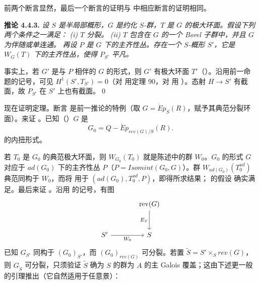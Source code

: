 前两个断言显然，最后一个断言的证明与  中相应断言的证明相同。

\textbf{推论 4.4.3.} \emph{设 \(S\) 是半局部概形，\(G\) 是约化 \(S\)-群，\(T\) 是 \(G\) 的极大环面。假设下列两个条件之一满足：}
\emph{(i) \(T\) 分裂。}
\emph{(ii) \(T\) 包含在 \(G\) 的一个 Borel 子群中，并且 \(G\) 为伴随或单连通。}
\emph{再设 \(P\) 是 \(G\) 下的主齐性丛。存在一个 \(S\)-概形 \(S'\)，它是 \(W_{G}(T)\) 下的主齐性丛，使得 \(P_{S'}\) 平凡。}

事实上，若 \(G'\) 是与 \(P\) 相伴的 \(G\) 的形式，则 \(G'\) 有极大环面 \(T'\)（）。沿用前一命题的记号，可见 \(H^{1}(S', T_{S'}) = 0\)（对  用定理 90，对  用 ）。态射 \(H \to S'\) 有截面，故 \(P_{S'}\) 在 \(S'\) 上也有截面。\qed

现在证明定理。断言  是前一推论的特例（取 \(G =\acute{E}p_{S}(R)\)，赋予其典范分裂环面）。来证 。已知（）\(G\) 是
\[ G_{0} = Q-\acute{E}p_{rev(G)/S}(R). \]
的内扭形式。

若 \(T_0\) 是 \(G_0\) 的典范极大环面，则 \(W_{G_{0}}(T_{0})\) 就是陈述中的群 \(W_0\)。\(G_0\) 的形式 \(G\) 对应于 \(ad(G_{0})\) 下的主齐性丛 \(P\)（\(P = Isomint(G_{0}, G)\)）。群 \(W_{ad(G_{0})}(T^{ad}_{0})\) 典范同构于 \(W_0\)，而将  用于 \((ad(G_{0}), T^{ad}_{0}, P)\)，即得所求结果； 的假设  确实满足。最后来证 。沿用  的记号，有图
\[
\begin{tikzcd}[column sep=large,row sep=large]
&
\operatorname{rev}(G) \arrow[d,"E_S"']
\\
S'
  \arrow[r,"W_0"']
&
S
\end{tikzcd}
\]
已知 \(G_{S'}\) 同构于 \((G_{0})_{S'}\)，而 \((G_{0})_{rev(G)}\) 可分裂。若置 \(\tilde{S} = S' \times_{S} rev(G)\)，则 \(G_{\tilde{S}}\) 可分裂，只须验证 \(\tilde{S}\) 确为 \(S\) 的群为 \(A\) 的主 Galois 覆盖；这由下述更一般的引理推出（它自然适用于任意景）：

